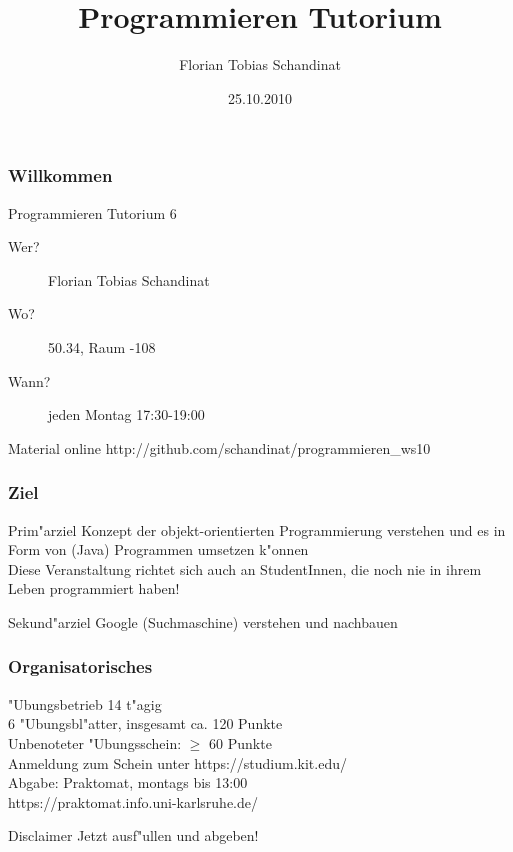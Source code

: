 \documentclass{beamer}
\title{Programmieren Tutorium}
\author{Florian Tobias Schandinat}
\date{25.10.2010}
\institute{FTS}
\begin{document}
\begin{frame}
\frametitle{Willkommen}
\begin{block}{Programmieren Tutorium 6}
\begin{description}
\item[Wer?] Florian Tobias Schandinat\\
\item[Wo?] 50.34, Raum -108\\
\item[Wann?] jeden Montag 17:30-19:00
\end{description}
\end{block}

\begin{block}{Material online}
http://github.com/schandinat/programmieren\_ws10
\end{block}
\end{frame}


\begin{frame}
\frametitle{Ziel}
\begin{block}{Prim"arziel}
Konzept der objekt-orientierten Programmierung verstehen und es in Form von (Java) Programmen umsetzen k"onnen\\[1em]
Diese Veranstaltung richtet sich auch an StudentInnen, die noch nie in ihrem Leben programmiert haben!
\end{block}

\pause

\begin{block}{Sekund"arziel}
Google (Suchmaschine) verstehen und nachbauen
\end{block}
\end{frame}


\begin{frame}
\frametitle{Organisatorisches}
\begin{block}{"Ubungsbetrieb}
14 t"agig\\
6 "Ubungsbl"atter, insgesamt ca. 120 Punkte\\
Unbenoteter "Ubungsschein: $\ge$ 60 Punkte\\
Anmeldung zum Schein unter https://studium.kit.edu/\\
Abgabe: \alert{Praktomat, montags bis 13:00}\\
https://praktomat.info.uni-karlsruhe.de/
\end{block}

\pause

\begin{block}{Disclaimer}
\alert{Jetzt ausf"ullen und abgeben!}
\end{block}
\end{frame}
\end{document}
